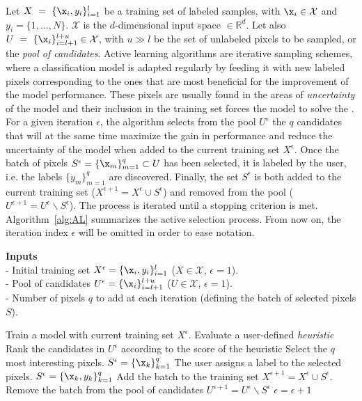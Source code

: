 \label{sec:AL}
Let $X~=~\{\x_i,y_i\}_{i=1}^l$ be a training set of labeled samples, with $\x_i \in \mathcal{X}$ and $y_i = \{1, ...,  N\}$. $\mathcal{X}$ is the $d$-dimensional input space $\in \mathbb{R}^d$. Let also $U~=~\{\x_i\}_{i=l+1}^{l+u} \in \mathcal{X}$, with $u \gg l$ be the set of unlabeled pixels to be sampled, or the \emph{pool of candidates}. 
Active learning algorithms are iterative sampling schemes, where a classification model is adapted regularly by feeding it with new labeled pixels corresponding to the ones that are most beneficial for the improvement of the model performance. These pixels are usually found in the areas of \emph{uncertainty} of the model and their inclusion in the training set forces the model to solve the . For a given iteration $\epsilon$, the algorithm selects from the pool $U^\epsilon$ the $q$ candidates that will at the same time maximize the gain in performance and reduce the uncertainty of the model when added to the current training set $X^\epsilon$. Once the batch of pixels $S^\epsilon = \{\x_m\}_{m=1}^q \subset U$ has been selected, it is labeled by the user, i.e. the labels $\{y_m\}_{m=1}^q$ are discovered. Finally, the set $S^\epsilon$ is both added to the current training set ($X^{\epsilon+1} = X^\epsilon \cup S^\epsilon$)  and removed from the pool ($U^{\epsilon+1} = U^\epsilon \backslash S^\epsilon$). The process is iterated until a stopping criterion is met. Algorithm~\ref{alg:AL} summarizes the active selection process. From now on, the iteration index $\epsilon$ will be omitted in order to ease notation. 
\begin{algorithm}[!t]
\caption{General active learning algorithm}
\label{alg:AL}
\vspace{0.2cm}
\textbf{Inputs}\\
- Initial training set $X^\epsilon = \{\x_i,y_i\}_{i=1}^l$ ($X \in \mathcal{X}$, $\epsilon=1$).\\
- Pool of candidates $U^\epsilon = \{\x_i\}_{i=l+1}^{l+u}$ ($U \in \mathcal{X}$, $\epsilon=1$).\\
- Number of pixels $q$ to add at each iteration (defining the batch of selected pixels $S$).
\vspace{0.2cm}
\begin{algorithmic}[1]
\REPEAT
	\STATE Train a model with current training set $X^\epsilon$.
	\STATE Evaluate a user-defined \emph{heuristic}
	\ENDFOR
	\STATE Rank the candidates in $U^\epsilon$ according to the score of the heuristic
	\STATE Select the $q$ most interesting pixels.  $S^\epsilon = \{\x_k\}_{k=1}^q$
	\STATE The user assigns a label to the selected pixels.  $S^\epsilon = \{\x_k,y_k\}_{k=1}^q$
	\STATE Add the batch to the training set $X^{\epsilon+1}=X^{\epsilon} \cup S^\epsilon$.
	\STATE Remove the batch from the pool of candidates $U^{\epsilon+1}=U^{\epsilon} \backslash S^\epsilon$
	\STATE $\epsilon = \epsilon + 1$
\end{algorithmic}
\vspace{0.2cm}
\end{algorithm}
